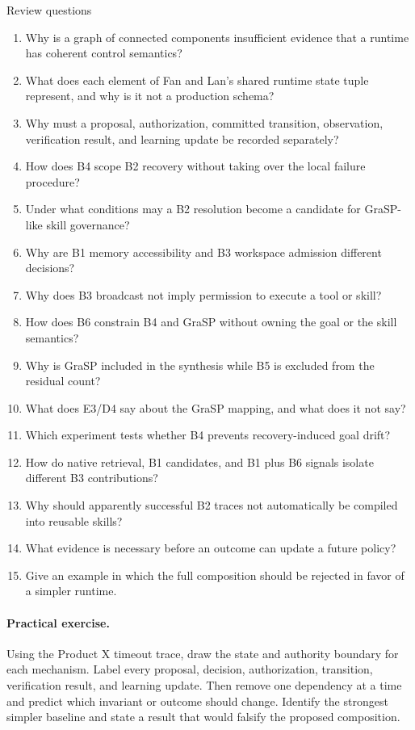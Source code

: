 \begin{reviewquestions}{Review questions}
\begin{enumerate}
  \item Why is a graph of connected components insufficient evidence that a runtime has coherent control semantics?
  \item What does each element of Fan and Lan's shared runtime state tuple represent, and why is it not a production schema?
  \item Why must a proposal, authorization, committed transition, observation, verification result, and learning update be recorded separately?
  \item How does B4 scope B2 recovery without taking over the local failure procedure?
  \item Under what conditions may a B2 resolution become a candidate for GraSP-like skill governance?
  \item Why are B1 memory accessibility and B3 workspace admission different decisions?
  \item Why does B3 broadcast not imply permission to execute a tool or skill?
  \item How does B6 constrain B4 and GraSP without owning the goal or the skill semantics?
  \item Why is GraSP included in the synthesis while B5 is excluded from the residual count?
  \item What does E3/D4 say about the GraSP mapping, and what does it not say?
  \item Which experiment tests whether B4 prevents recovery-induced goal drift?
  \item How do native retrieval, B1 candidates, and B1 plus B6 signals isolate different B3 contributions?
  \item Why should apparently successful B2 traces not automatically be compiled into reusable skills?
  \item What evidence is necessary before an outcome can update a future policy?
  \item Give an example in which the full composition should be rejected in favor of a simpler runtime.
\end{enumerate}
\end{reviewquestions}

\paragraph{Practical exercise.} Using the Product X timeout trace, draw the state and authority boundary for each mechanism. Label every proposal, decision, authorization, transition, verification result, and learning update. Then remove one dependency at a time and predict which invariant or outcome should change. Identify the strongest simpler baseline and state a result that would falsify the proposed composition.

